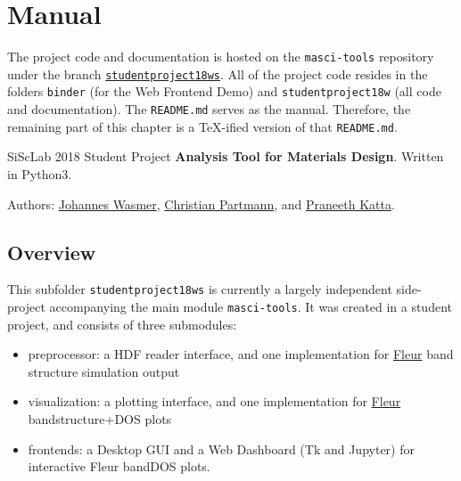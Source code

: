 
\chapter{Manual}
\label{cha:manual}

The project code and documentation is hosted on the \texttt{masci-tools}
repository \cite{masci-tools} under the branch
\href{https://github.com/JuDFTteam/masci-tools/tree/studentproject18ws}{\texttt{studentproject18ws}}.
All of the project code resides in the folders \texttt{binder} (for the Web
Frontend Demo) and \texttt{studentproject18w} (all code and documentation). The
\texttt{README.md} serves as the manual. Therefore, the remaining part of this
chapter is a \TeX{}-ified version of that \texttt{README.md}.

\vspace{3em}
\hdashrule{\textwidth}{2pt}{2pt}

SiScLab 2018 Student Project \textbf{Analysis Tool for Materials
Design}. Written in Python3.

Authors: \href{https://github.com/Irratzo}{Johannes Wasmer},
\href{https://github.com/ChristianPartmann}{Christian Partmann}, and
\href{https://github.com/PraneethKatta}{Praneeth Katta}.

\section{Overview}\label{overview}

This subfolder \texttt{studentproject18ws} is currently a largely
independent side-project accompanying the main module
\texttt{masci-tools}. It was created in a student project, and consists
of three submodules:

\begin{itemize}
\tightlist
\item
  preprocessor: a HDF reader interface, and one implementation for
  \href{http://www.judft.de}{Fleur} band structure simulation output
\item
  visualization: a plotting interface, and one implementation for
  \href{http://www.judft.de}{Fleur} bandstructure+DOS plots
\item
  frontends: a Desktop GUI and a Web Dashboard (Tk and Jupyter) for
  interactive Fleur bandDOS plots.
\end{itemize}

